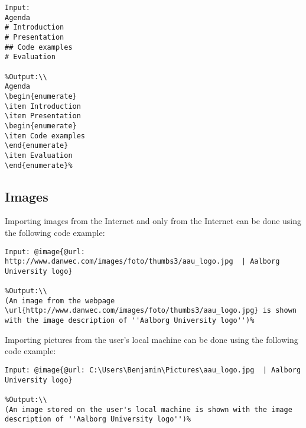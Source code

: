 \begin{lstlisting}[frame=single]
Input:
Agenda
# Introduction
# Presentation
## Code examples
# Evaluation

%Output:\\
Agenda
\begin{enumerate}
\item Introduction
\item Presentation
\begin{enumerate}
\item Code examples
\end{enumerate}
\item Evaluation
\end{enumerate}%
\end{lstlisting}


\subsection{Images}
Importing images from the Internet and only from the Internet can be done using the following code example:
\begin{lstlisting}[frame=single]
Input: @image{@url: http://www.danwec.com/images/foto/thumbs3/aau_logo.jpg  | Aalborg University logo}

%Output:\\
(An image from the webpage \url{http://www.danwec.com/images/foto/thumbs3/aau_logo.jpg} is shown with the image description of ''Aalborg University logo'')%
\end{lstlisting}
Importing pictures from the user's local machine can be done using the following code example:
\begin{lstlisting}[frame=single]
Input: @image{@url: C:\Users\Benjamin\Pictures\aau_logo.jpg  | Aalborg University logo}

%Output:\\
(An image stored on the user's local machine is shown with the image description of ''Aalborg University logo'')%
\end{lstlisting}

